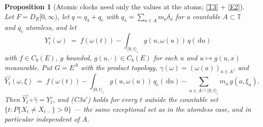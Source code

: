 \documentclass[11pt,a4paper]{article}
\theoremstyle{plain}
\newtheorem{proposition}[theorem]{Proposition}
\theoremstyle{definition}
\theoremstyle{remark}
\newcommand{\T}{\mathbb{T}}                     %
\newcommand{\Cb}{C_b}                          %
\newcommand{\DE}{D_E[0,\infty)}
\newcommand{\dif}{\,\mathrm{d}}
\begin{document}
\begin{proposition}[Atomic clocks need only the values at the atoms; \eqref{T3} + \eqref{E2}]
  \label{prop:atomaug}
  Let $F = \DE$, let $q = q_{\mathrm{a}} + q_{\mathrm{c}}$ with
  $q_{\mathrm{a}} = \sum_{a \in A} m_a \delta_a$ for a countable $A \subset \T$ and
  $q_{\mathrm{c}}$ atomless, and let
  \[
    Y^\circ_t(\omega) \;=\; f(\omega(t))
      - \int_{\langle 0,t\rangle_\iota} g(u,\omega(u)) \, q(\dif u)
  \]
  with $f \in \Cb(E)$, $g$ bounded, $g(u,\cdot) \in \Cb(E)$ for each $u$ and
  $u \mapsto g(u,x)$ measurable.  Put $G = E^A$ with the product topology,
  $\gamma(\omega) = (\omega(a))_{a \in A}$, and
  \begin{equation}
    \label{eq:Yhat}
    \hat{Y}^\circ_t(\omega,\xi) \;=\; f(\omega(t))
      - \int_{\langle 0,t\rangle_\iota} g(u,\omega(u)) \, q_{\mathrm{c}}(\dif u)
      - \sum_{a \in A \cap \langle 0,t\rangle_\iota} m_a \, g(a,\xi_a) .
  \end{equation}
  Then $\hat{Y}^\circ_t \circ \hat\gamma = Y^\circ_t$, and \textup{(C3a$'$)} holds
  for every $t$ outside the countable set $\{t : P\{X_t \neq X_{t-}\} > 0\}$ ---
  the same exceptional set as in the atomless case, and in particular independent
  of $A$.
\end{proposition}
\end{document}
